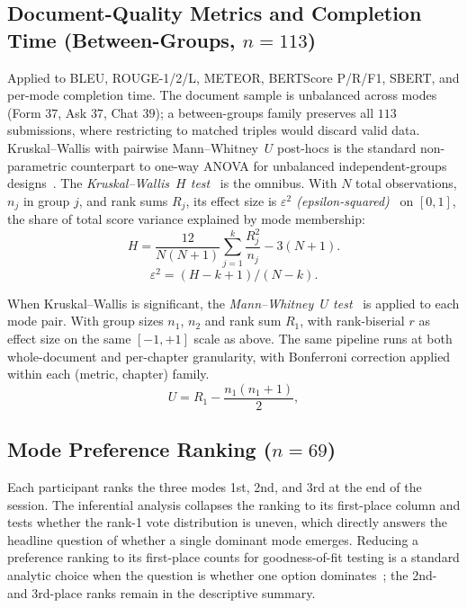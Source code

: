 \subsection{Document-Quality Metrics and Completion Time (Between-Groups, $n = 113$)}

Applied to BLEU, ROUGE-1/2/L, METEOR, BERTScore P/R/F1, SBERT, and per-mode completion time.
The document sample is unbalanced across modes (Form $37$, Ask $37$, Chat $39$); a between-groups family preserves all $113$ submissions,
where restricting to matched triples would discard valid data. Kruskal--Wallis with pairwise Mann--Whitney~$U$ post-hocs is the standard non-parametric counterpart to one-way ANOVA for unbalanced independent-groups designs~\cite{Field2018}.
The \emph{Kruskal--Wallis~$H$ test}~\cite{KruskalWallis1952} is the omnibus. With $N$ total observations, $n_j$ in group $j$, and rank sums $R_j$,
its effect size is \emph{$\varepsilon^2$ (epsilon-squared)}~\cite{Kelley1935} on $[0, 1]$, the share of total score variance explained by mode membership:
\begin{equation}
H = \frac{12}{N (N+1)} \sum_{j=1}^{k} \frac{R_j^2}{n_j} - 3 (N + 1).
\end{equation}
\begin{equation}
\varepsilon^2 = (H - k + 1) / (N - k).
\end{equation}

When Kruskal--Wallis is significant, the \emph{Mann--Whitney~$U$ test}~\cite{MannWhitney1947} is applied to each mode pair. With group sizes $n_1$, $n_2$ and rank sum $R_1$,
with rank-biserial $r$ as effect size on the same $[-1, +1]$ scale as above.
The same pipeline runs at both whole-document and per-chapter granularity, with Bonferroni correction applied within each (metric, chapter) family.
\begin{equation}
U = R_1 - \frac{n_1 (n_1 + 1)}{2},
\end{equation}

\subsection{Mode Preference Ranking ($n = 69$)}

Each participant ranks the three modes 1st, 2nd, and 3rd at the end of the session. The inferential analysis collapses the ranking to its first-place column and tests whether the rank-1 vote distribution is uneven, which directly answers the headline question of whether a single dominant mode emerges. Reducing a preference ranking to its first-place counts for goodness-of-fit testing is a standard analytic choice when the question is whether one option dominates~\cite{SauroLewis2016}; the 2nd- and 3rd-place ranks remain in the descriptive summary.

